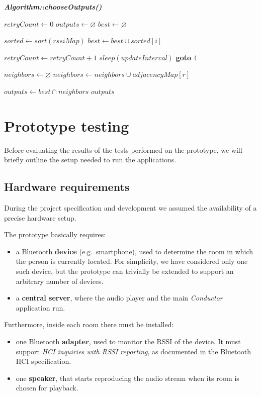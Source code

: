 \documentclass[conference]{IEEEtran}
\newcommand{\Conductor}{\textsl{Conductor}}
\begin{document}
\vspace{2mm}
\textbf{\textit{Algorithm::chooseOutputs()}}
\begin{algorithmic}[1]
\STATE $retryCount \gets 0$
\STATE $outputs \gets \varnothing$
\STATE $best \gets \varnothing$

\STATE $sorted \gets sort(rssiMap)$
	\STATE $best \gets best \cup sorted[i]$
\ENDFOR

	\STATE $retryCount \gets retryCount + 1$
	\STATE $sleep(updateInterval)$
	\STATE \textbf{goto} 4
\ENDIF

\STATE $neighbors \gets \varnothing$
	\STATE $neighbors \gets neighbors \cup adjacencyMap[r]$
\ENDFOR

\STATE $outputs \gets best \cap neighbors$
\RETURN $outputs$
\end{algorithmic}


\vspace{4mm}
\section{Prototype testing}
Before evaluating the results of the tests performed on the prototype, we will briefly outline the setup needed to run the applications.

\subsection{Hardware requirements}
\label{hardware-requirements}
During the project specification and development we assumed the availability of a precise hardware setup.

The prototype basically requires:
\begin{itemize}
	\item a Bluetooth \textbf{device} (e.g.\ smartphone), used to determine the room in which the person is currently located. For simplicity, we have considered only one such device, but the prototype can trivially be extended to support an arbitrary number of devices.
	\item a \textbf{central server}, where the audio player and the main \Conductor{} application run.
\end{itemize}
Furthermore, inside each room there must be installed:
\begin{itemize}
	\item one Bluetooth \textbf{adapter}, used to monitor the RSSI of the device. It must support \textit{HCI inquiries with RSSI reporting}, as documented in the Bluetooth HCI specification.
	\item one \textbf{speaker}, that starts reproducing the audio stream when its room is chosen for playback.
\end{itemize}
\end{document}
